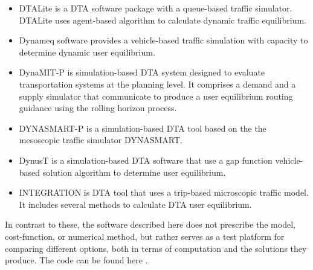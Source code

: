 \begin{itemize}
\item DTALite \cite{zhou2014dtalite} is a DTA software package with a queue-based traffic simulator. DTALite uses agent-based algorithm to calculate dynamic traffic equilibrium.
\item Dynameq \cite{mahut2010traffic} software provides a vehicle-based traffic simulation with capacity to determine dynamic user equilibrium.  
\item DynaMIT-P \cite{DynaMIT,ben2001dynamit} is simulation-based DTA system designed to evaluate transportation
systems at the planning level. It comprises a demand and a supply simulator that communicate to produce a user equilibrium routing guidance using the rolling horizon process. 
\item DYNASMART-P \cite{DYNASMART,mahmassani2004dynasmart} is a simulation-based DTA tool based on the the mesoscopic traffic simulator DYNASMART. 
\item DynusT \cite{chiu2011dynust} is a simulation-based DTA software that use a gap function vehicle-based solution algorithm to determine user equilibrium.
\item INTEGRATION \cite{rakha2012integration} is DTA tool that uses a trip-based microscopic traffic model. It includes several methods to calculate DTA user equilibrium. 

\end{itemize}

In contrast to these, the software described here does not prescribe the model, cost-function, or numerical method, but rather serves as a test platform for comparing different options, both in terms of computation and the solutions they produce. The code can be found here \cite{ta_solver}.




 

